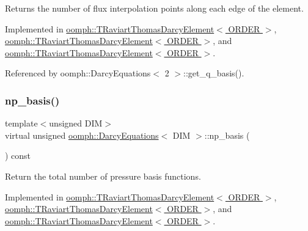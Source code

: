 Returns the number of flux interpolation points along each edge of the element. 



Implemented in \hyperlink{classoomph_1_1TRaviartThomasDarcyElement_a0dfc4273d662f5e70284c4cedb2f9b7b}{oomph\+::\+T\+Raviart\+Thomas\+Darcy\+Element$<$ O\+R\+D\+E\+R $>$}, \hyperlink{classoomph_1_1TRaviartThomasDarcyElement_aee9de4e429ee7852f960a9cf80bfe4fc}{oomph\+::\+T\+Raviart\+Thomas\+Darcy\+Element$<$ O\+R\+D\+E\+R $>$}, and \hyperlink{classoomph_1_1TRaviartThomasDarcyElement_a7c515fbe4bb25c8c67565fb1584f7f6b}{oomph\+::\+T\+Raviart\+Thomas\+Darcy\+Element$<$ O\+R\+D\+E\+R $>$}.



Referenced by oomph\+::\+Darcy\+Equations$<$ 2 $>$\+::get\+\_\+q\+\_\+basis().

\mbox{\label{classoomph_1_1DarcyEquations_a2a27050f99b0dd3ab6686807fa84f866}} 
\subsubsection{\texorpdfstring{np\+\_\+basis()}{np\_basis()}}
{\footnotesize\ttfamily template$<$unsigned D\+IM$>$ \\
virtual unsigned \hyperlink{classoomph_1_1DarcyEquations}{oomph\+::\+Darcy\+Equations}$<$ D\+IM $>$\+::np\+\_\+basis (\begin{DoxyParamCaption}{ }\end{DoxyParamCaption}) const\hspace{0.3cm}{\ttfamily [pure virtual]}}



Return the total number of pressure basis functions. 



Implemented in \hyperlink{classoomph_1_1TRaviartThomasDarcyElement_a1717d9e302ead84ad212bafd1cb86c9e}{oomph\+::\+T\+Raviart\+Thomas\+Darcy\+Element$<$ O\+R\+D\+E\+R $>$}, \hyperlink{classoomph_1_1TRaviartThomasDarcyElement_a73c28d7e3789db421c5c5eccc3e25581}{oomph\+::\+T\+Raviart\+Thomas\+Darcy\+Element$<$ O\+R\+D\+E\+R $>$}, and \hyperlink{classoomph_1_1TRaviartThomasDarcyElement_a89bd2a644fa5e3bd9317c98ae8ab1638}{oomph\+::\+T\+Raviart\+Thomas\+Darcy\+Element$<$ O\+R\+D\+E\+R $>$}.



